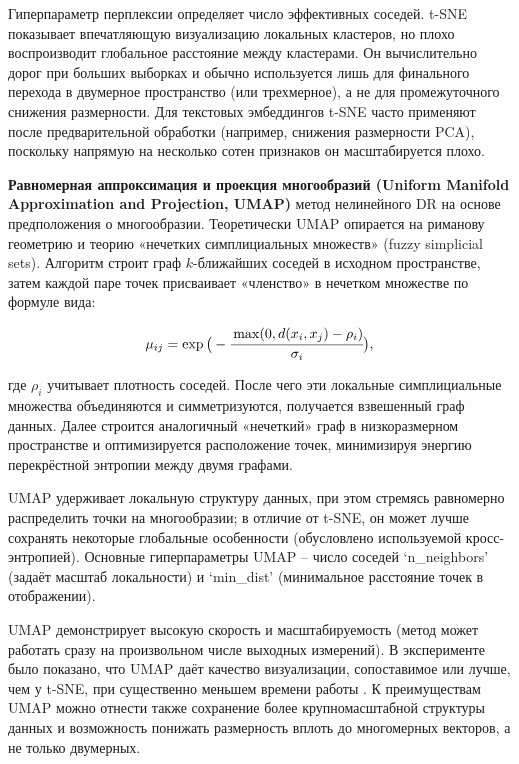 Гиперпараметр перплексии определяет число эффективных соседей. t-SNE показывает впечатляющую визуализацию
локальных кластеров, но плохо воспроизводит глобальное расстояние между кластерами. Он вычислительно дорог
при больших выборках и обычно используется лишь для финального перехода в двумерное пространство (или трехмерное),
а не для промежуточного снижения размерности. Для текстовых эмбеддингов t-SNE часто применяют после
предварительной обработки (например, снижения размерности PCA), поскольку напрямую на несколько сотен
признаков он масштабируется плохо.

\textbf{Равномерная аппроксимация и проекция многообразий (Uniform Manifold Approximation and Projection, UMAP)}
метод нелинейного DR на основе предположения о многообразии. Теоретически UMAP опирается на риманову
геометрию и теорию «нечетких симплициальных множеств» (fuzzy simplicial sets). Алгоритм строит граф
$k$-ближайших соседей в исходном пространстве, затем каждой паре точек присваивает «членство» в нечетком
множестве по формуле вида:

\begin{equation}
    \mu_{ij}=\exp\big(-\cfrac{\max(0, d(x_i, x_j) - \rho_i)}{\sigma_i}\big),
\end{equation}

где $\rho_i$ учитывает плотность соседей. После чего эти локальные симплициальные множества объединяются
и симметризуются, получается взвешенный граф данных. Далее строится аналогичный «нечеткий» граф в низкоразмерном
пространстве и оптимизируется расположение точек, минимизируя энергию перекрёстной энтропии между двумя графами.

UMAP удерживает локальную структуру данных, при этом стремясь равномерно распределить точки на многообразии;
в отличие от t-SNE, он может лучше сохранять некоторые глобальные особенности (обусловлено используемой
кросс-энтропией). Основные гиперпараметры UMAP – число соседей ‘n\_neighbors’ (задаёт масштаб локальности)
и ‘min\_dist’ (минимальное расстояние точек в отображении).

UMAP демонстрирует высокую скорость и масштабируемость (метод может работать сразу на произвольном числе
выходных измерений). В эксперименте было показано, что UMAP даёт качество визуализации, сопоставимое или лучше,
чем у t-SNE, при существенно меньшем времени работы \parencite{UMAP2018mcinnes}. К преимуществам UMAP можно
отнести также сохранение более крупномасштабной структуры данных и возможность понижать размерность вплоть
до многомерных векторов, а не только двумерных.


